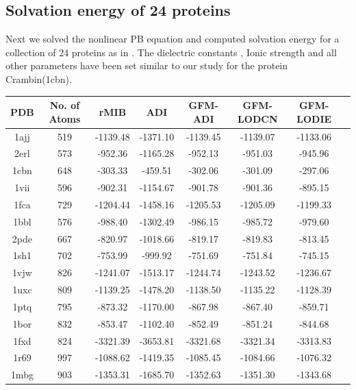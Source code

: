 

\subsection{Solvation energy of 24 proteins}
Next we solved the nonlinear PB equation and computed solvation energy for a collection of 24 proteins as in \cite{Geng2007,Geng2017a}. The dielectric constants , Ionic strength and all other parameters have been set similar to our study for the protein Crambin(1cbn).  
 

\begin{table}[!ht]
\centering
\begin{tabular}{ c c c c c c c c}
\hline
\scriptsize{PDB} & \scriptsize{No. of Atoms}& \scriptsize{rMIB}   &   \scriptsize{ADI}    &  \scriptsize{GFM-ADI}  & \scriptsize{GFM-LODCN} & \scriptsize{GFM-LODIE}\\ \hline
1ajj & 519  & -1139.48 & -1371.10 & -1139.45 & -1139.07 & -1133.06 \\
2erl & 573  & -952.36  & -1165.28 & -952.13  & -951.03  & -945.96  \\
1cbn & 648  & -303.33  & -459.51  & -302.06  & -301.09  & -297.06  \\
1vii & 596  & -902.31  & -1154.67 & -901.78  & -901.36  & -895.15  \\
1fca & 729  & -1204.44 & -1458.16 & -1205.53 & -1205.09 & -1199.33 \\
1bbl & 576  & -988.40  & -1302.49 & -986.15  & -985.72  & -979.60  \\
2pde & 667  & -820.97  & -1018.66 & -819.17  & -819.83  & -813.45  \\
1sh1 & 702  & -753.99  & -999.92  & -751.69  & -751.84  & -745.15  \\
1vjw & 826  & -1241.07 & -1513.17 & -1244.74 & -1243.52 & -1236.67 \\
1uxc & 809  & -1139.25 & -1478.20 & -1138.50 & -1135.22 & -1128.39 \\
1ptq & 795  & -873.32  & -1170.00 & -867.98  & -867.40  & -859.71  \\
1bor & 832  & -853.47  & -1102.40 & -852.49  & -851.24  & -844.68  \\
1fxd & 824  & -3321.39 & -3653.81 & -3321.68 & -3321.34 & -3313.83 \\
1r69 & 997  & -1088.62 & -1419.35 & -1085.45 & -1084.66 & -1076.32 \\
1mbg & 903  & -1353.31 & -1685.70 & -1352.63 & -1351.30 & -1343.68 \\

\end{tabular}
\end{table}
